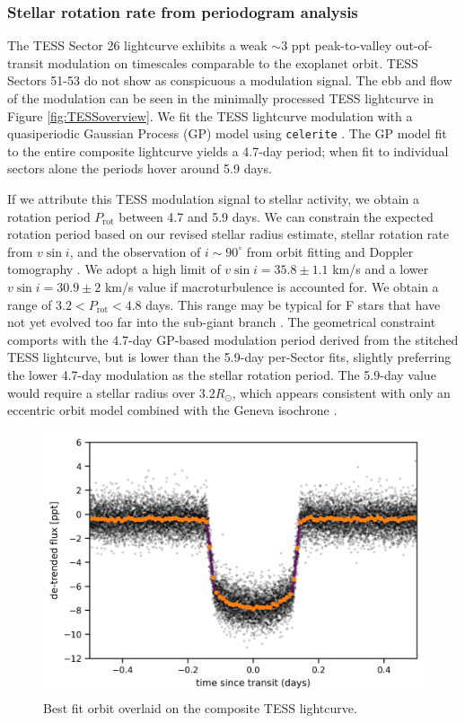 \documentclass[twocolumn]{aastex631}
\begin{document}
\subsubsection{Stellar rotation rate from periodogram analysis}\label{TESSmodulation}

The TESS Sector 26 lightcurve exhibits a weak $\sim$3 ppt peak-to-valley out-of-transit modulation on timescales comparable to the exoplanet orbit. TESS Sectors 51-53 do not show as conspicuous a modulation signal.  The ebb and flow of the modulation can be seen in the minimally processed TESS lightcurve in Figure \ref{fig:TESSoverview}.  We fit the TESS lightcurve modulation with a quasiperiodic Gaussian Process (GP) model using \texttt{celerite} \citep{celerite1,celerite2}.  The GP model fit to the entire composite lightcurve yields a 4.7-day period; when fit to individual sectors alone the periods hover around 5.9 days.

If we attribute this TESS modulation signal to stellar activity, we obtain a rotation period $P_\mathrm{rot}$ between 4.7 and 5.9 days.  We can constrain the expected rotation period based on our revised stellar radius estimate, stellar rotation rate from $v\sin{i}$, and the observation of $i\sim90^\circ$ from orbit fitting and Doppler tomography \citep{2017AJ....153..211Z}.  We adopt a high limit of $v\sin{i}=35.8\pm1.1$ km/s and a lower $v\sin{i}=30.9\pm2$ km/s value if macroturbulence is accounted for.  We obtain a range of $3.2 < P_\mathrm{rot}  < 4.8 $ days.  This range may be typical for F stars that have not yet evolved too far into the sub-giant branch \citep{2022ApJ...930....7A}.  The geometrical constraint comports with the 4.7-day GP-based modulation period derived from the stitched TESS lightcurve, but is lower than the 5.9-day per-Sector fits, slightly preferring the lower 4.7-day modulation as the stellar rotation period.  The 5.9-day value would require a stellar radius over 3.2$R_\odot$, which appears consistent with only an eccentric orbit model combined with the Geneva isochrone \citep{2017AJ....153..211Z}.


\begin{figure}
    \includegraphics[width=\linewidth]{figures/best_fit_orbit.png}
    \caption{Best fit orbit overlaid on the composite TESS lightcurve.}
    \label{fig:transit}
\end{figure}
\end{document}
